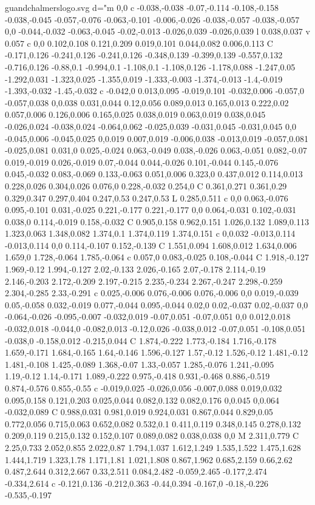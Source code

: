 \begin{filecontents}[noheader]{guandchalmerslogo.svg}
			   d="m 0,0 c -0.038,-0.038 -0.07,-0.114 -0.108,-0.158 -0.038,-0.045 -0.057,-0.076 -0.063,-0.101 -0.006,-0.026 -0.038,-0.057 -0.038,-0.057 0,0 -0.044,-0.032 -0.063,-0.045 -0.02,-0.013 -0.026,0.039 -0.026,0.039 l 0.038,0.037 v 0.057 c 0,0 0.102,0.108 0.121,0.209 0.019,0.101 0.044,0.082 0.006,0.113 C -0.171,0.126 -0.241,0.126 -0.241,0.126 -0.348,0.139 -0.399,0.139 -0.557,0.132 -0.716,0.126 -0.88,0.1 -0.994,0.1 -1.108,0.1 -1.108,0.126 -1.178,0.088 -1.247,0.05 -1.292,0.031 -1.323,0.025 -1.355,0.019 -1.333,-0.003 -1.374,-0.013 -1.4,-0.019 -1.393,-0.032 -1.45,-0.032 c -0.042,0 0.013,0.095 -0.019,0.101 -0.032,0.006 -0.057,0 -0.057,0.038 0,0.038 0.031,0.044 0.12,0.056 0.089,0.013 0.165,0.013 0.222,0.02 0.057,0.006 0.126,0.006 0.165,0.025 0.038,0.019 0.063,0.019 0.038,0.045 -0.026,0.024 -0.038,0.024 -0.064,0.062 -0.025,0.039 -0.031,0.045 -0.031,0.045 0,0 -0.045,0.006 -0.045,0.025 0,0.019 0.007,0.019 -0.006,0.038 -0.013,0.019 -0.057,0.081 -0.025,0.081 0.031,0 0.025,-0.024 0.063,-0.049 0.038,-0.026 0.063,-0.051 0.082,-0.07 0.019,-0.019 0.026,-0.019 0.07,-0.044 0.044,-0.026 0.101,-0.044 0.145,-0.076 0.045,-0.032 0.083,-0.069 0.133,-0.063 0.051,0.006 0.323,0 0.437,0.012 0.114,0.013 0.228,0.026 0.304,0.026 0.076,0 0.228,-0.032 0.254,0 C 0.361,0.271 0.361,0.29 0.329,0.347 0.297,0.404 0.247,0.53 0.247,0.53 L 0.285,0.511 c 0,0 0.063,-0.076 0.095,-0.101 0.031,-0.025 0.221,-0.177 0.221,-0.177 0,0 0.064,-0.031 0.102,-0.031 0.038,0 0.114,-0.019 0.158,-0.032 C 0.905,0.158 0.962,0.151 1.026,0.132 1.089,0.113 1.323,0.063 1.348,0.082 1.374,0.1 1.374,0.119 1.374,0.151 c 0,0.032 -0.013,0.114 -0.013,0.114 0,0 0.114,-0.107 0.152,-0.139 C 1.551,0.094 1.608,0.012 1.634,0.006 1.659,0 1.728,-0.064 1.785,-0.064 c 0.057,0 0.083,-0.025 0.108,-0.044 C 1.918,-0.127 1.969,-0.12 1.994,-0.127 2.02,-0.133 2.026,-0.165 2.07,-0.178 2.114,-0.19 2.146,-0.203 2.172,-0.209 2.197,-0.215 2.235,-0.234 2.267,-0.247 2.298,-0.259 2.304,-0.285 2.33,-0.291 c 0.025,-0.006 0.076,-0.006 0.076,-0.006 0,0 0.019,-0.039 0.05,-0.058 0.032,-0.019 0.077,-0.044 0.095,-0.044 0.02,0 0.02,-0.037 0.02,-0.037 0,0 -0.064,-0.026 -0.095,-0.007 -0.032,0.019 -0.07,0.051 -0.07,0.051 0,0 0.012,0.018 -0.032,0.018 -0.044,0 -0.082,0.013 -0.12,0.026 -0.038,0.012 -0.07,0.051 -0.108,0.051 -0.038,0 -0.158,0.012 -0.215,0.044 C 1.874,-0.222 1.773,-0.184 1.716,-0.178 1.659,-0.171 1.684,-0.165 1.64,-0.146 1.596,-0.127 1.57,-0.12 1.526,-0.12 1.481,-0.12 1.481,-0.108 1.425,-0.089 1.368,-0.07 1.33,-0.057 1.285,-0.076 1.241,-0.095 1.19,-0.12 1.14,-0.171 1.089,-0.222 0.975,-0.418 0.931,-0.468 0.886,-0.519 0.874,-0.576 0.855,-0.55 c -0.019,0.025 -0.026,0.056 -0.007,0.088 0.019,0.032 0.095,0.158 0.121,0.203 0.025,0.044 0.082,0.132 0.082,0.176 0,0.045 0,0.064 -0.032,0.089 C 0.988,0.031 0.981,0.019 0.924,0.031 0.867,0.044 0.829,0.05 0.772,0.056 0.715,0.063 0.652,0.082 0.532,0.1 0.411,0.119 0.348,0.145 0.278,0.132 0.209,0.119 0.215,0.132 0.152,0.107 0.089,0.082 0.038,0.038 0,0 M 2.311,0.779 C 2.25,0.733 2.052,0.855 2.022,0.87 1.794,1.037 1.612,1.249 1.535,1.522 1.475,1.628 1.444,1.719 1.323,1.78 1.171,1.81 1.021,1.808 0.867,1.962 0.685,2.159 0.66,2.62 0.487,2.644 0.312,2.667 0.33,2.511 0.084,2.482 -0.059,2.465 -0.177,2.474 -0.334,2.614 c -0.121,0.136 -0.212,0.363 -0.44,0.394 -0.167,0 -0.18,-0.226 -0.535,-0.197 
\end{filecontents}
